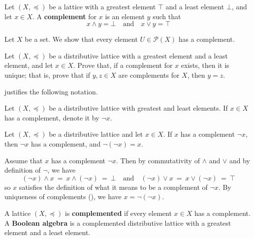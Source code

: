\begin{definition}
\label{defComplement}
Let $(X, \preceq)$ be a lattice with a greatest element $\top$ and a least element $\bot$, and let $x \in X$. A \textbf{complement} for $x$ is an element $y$ such that
\[ x \wedge y = \bot \quad \text{and} \quad x \vee y = \top \]
\end{definition}

\begin{example}
Let $X$ be a set. We show that every element $U \in \mathcal{P}(X)$ has a complement.
\end{example}

\begin{exercise}
Let $(X, \preceq)$ be a distributive lattice with a greatest element and a least element, and let $x \in X$. Prove that, if a complement for $x$ exists, then it is unique; that is, prove that if $y,z \in X$ are complements for $X$, then $y=z$.
\end{exercise}

 justifies the following notation.

\begin{notation}
\label{ntnComplement}
Let $(X, \preceq)$ be a distributive lattice with greatest and least elements. If $x \in X$ has a complement, denote it by $\neg x$.
\end{notation}

\begin{proposition}
\label{propDoubleNegation}
Let $(X, \preceq)$ be a distributive lattice and let $x \in X$. If $x$ has a complement $\neg x$, then $\neg x$ has a complement, and $\neg (\neg x) = x$.
\end{proposition}

\begin{cproof}
Assume that $x$ has a complement $\neg x$. Then by commutativity of $\wedge$ and $\vee$ and by definition of $\neg$, we have
\[ (\neg x) \wedge x ~=~ x \wedge (\neg x) ~=~ \bot \quad \text{and} \quad (\neg x) \vee x ~=~ x \vee (\neg x) ~=~ \top \]
so $x$ satisfies the definition of what it means to be a complement of $\neg x$. By uniqueness of complements (), we have $x = \neg (\neg x)$.
\end{cproof}

\begin{definition}
\label{defBooleanAlgebra}
A lattice $(X, \preceq)$ is \textbf{complemented} if every element $x \in X$ has a complement. A \textbf{Boolean algebra} is a complemented distributive lattice with a greatest element and a least element.
\end{definition}

